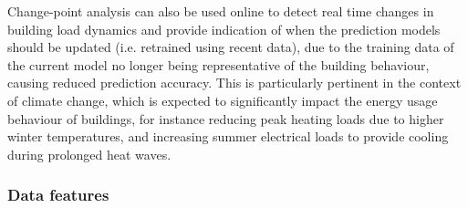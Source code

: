 Change-point analysis can also be used online to detect real time changes in building load dynamics and provide indication of when the prediction models should be updated (i.e. retrained using recent data), due to the training data of the current model no longer being representative of the building behaviour, causing reduced prediction accuracy. This is particularly pertinent in the context of climate change, which is expected to significantly impact the energy usage behaviour of buildings, for instance reducing peak heating loads due to higher winter temperatures, and increasing summer electrical loads to provide cooling during prolonged heat waves.

\subsubsection{Data features} \label{sec:forecasting-data-efficiency-data-features}


